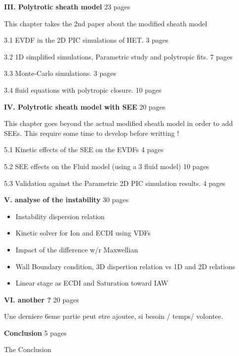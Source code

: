 {\bf III. Polytrotic sheath model} 23 pages
\begin{zzz}
  This chapter takes the 2nd paper about the modified sheath model

  3.1 EVDF in the 2D PIC simulations of HET.    3 pages

  3.2 1D simplified simulations, Parametric study and polytropic fits. 7 pages

  3.3 Monte-Carlo simulations.  3 pages

  3.4 fluid equations with polytropic closure. 10 pages
\end{zzz}

{\bf IV. Polytrotic sheath model with SEE} 20 pages
\begin{zzz}
  This chapter goes beyond the actual modified sheath model in order to add SEEs.
  This require some time to develop before writting !

  5.1 Kinetic effects of the SEE on the EVDFs  4 pages

  5.2 SEE effects on the Fluid model (using a 3 fluid model)  10 pages

  5.3 Validation against the Parametric 2D PIC simulation results. 4 pages
\end{zzz}

{\bf V. analyse of the instability } 30 pages
\begin{zzz}
  \begin{itemize}
\item Instability dispersion relation
\item Kinetic solver for Ion and ECDI using VDFs
\item Impact of the difference w/r Maxwellian
\item Wall Boundary condition, 3D dispertion relation vs 1D and 2D relations
\item Linear stage as ECDI and Saturation toward IAW
\end{itemize}
\end{zzz}


{\bf VI. another ? } 20 pages

Une derniere 6eme partie peut etre ajoutee, si besoin / temps/ volontee.

\linebreak
{\bf Conclusion } 5 pages
\begin{zzz}
The Conclusion
\end{zzz}


